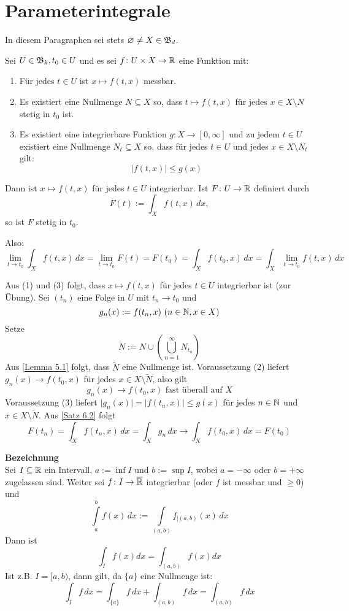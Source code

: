 \documentclass[a4paper,twoside,DIV15,BCOR12mm,chapterprefix=true,headings=onelinechapter]{scrbook}
\begin{document}
\chapter{Parameterintegrale}
In diesem Paragraphen sei stets \(\varnothing\neq X\in \mathfrak{B}_d\).

\begin{satz}
\label{Satz 7.1}
Sei \(U\in\mathfrak{B}_k, t_0\in U\) und es sei \(f\colon U\times X\to \mathbb{R}\) eine Funktion mit:
\begin{enumerate}
	\item 	Für jedes \(t\in U\) ist \(x\mapsto f(t,x)\) messbar.
	\item 	Es existiert eine Nullmenge \(N\subseteq X\) so, dass \(t\mapsto f(t,x)\) für jedes \(x\in X\setminus N\) stetig in $t_0$ ist.
	\item 	Es existiert eine integrierbare Funktion \(g\colon X\to [0,\infty]\) und zu jedem \(t\in U\) existiert eine Nullmenge \(N_t\subseteq X\) so, dass für 
		jedes \(t\in U\) und jedes \(x\in X\setminus N_t\) gilt: \[ \lvert f(t,x)\rvert \leq g(x) \]
\end{enumerate}
Dann ist \(x\mapsto f(t,x)\) für jedes \(t\in U\) integrierbar. Ist \(F\colon U\to\mathbb{R}\) definiert durch
\[ F(t):=\int_Xf(t,x)\,dx,\]
so ist $F$ stetig in $t_0$.
\end{satz}

Also: \[ \lim\limits_{t\to t_0}\int_X f(t,x)\,dx = \lim\limits_{t\to t_0}F(t)=F(t_0) = \int_X f(t_0,x)\,dx =\int_X\lim\limits_{t\to t_0} f(t,x)\,dx \]

\begin{beweis}
Aus (1) und (3) folgt, dass \(x\mapsto f(t,x)\) für jedes \(t\in U\) integrierbar ist (zur Übung). Sei \((t_n)\) eine Folge in $U$ mit \(t_n\to t_0\) und 
\[g_n(x):=f(t_n,x) \ (n\in\mathbb{N}, x\in X) \]
Setze \[ \tilde N := N\cup \left(\bigcup^\infty_{n=1}N_{t_n} \right) \]
Aus \ref{Lemma 5.1} folgt, dass \(\tilde N\) eine Nullmenge ist. Voraussetzung (2) liefert \(g_n(x)\to f(t_0,x)\) für jedes \(x\in X\setminus\tilde N\), also gilt 
\[g_n(x)\to f(t_0,x) \text{ fast überall auf } X\]
Voraussetzung (3) liefert \(\lvert g_n(x)\rvert = \lvert f(t_n,x)\rvert \leq g(x) \) für jedes \(n\in\mathbb{N}\) und \(x\in X\setminus\tilde N\). Aus \ref{Satz 6.2} folgt
\[ F(t_n) = \int_X f(t_n,x)\,dx = \int_Xg_n\,dx \longrightarrow \int_X f(t_0,x)\,dx = F(t_0) \]
\end{beweis}

\textbf{Bezeichnung}\\
Sei \(I\subseteq\mathbb{R}\) ein Intervall, \(a:=\inf I\) und \(b:=\sup I\), wobei \(a=-\infty\) oder \(b=+\infty\) zugelassen sind. Weiter sei \(f\colon I\to\overline{\mathbb{R}}\) integrierbar 
(oder $f$ ist messbar und \(\geq 0\)) und 
\[\int\limits^b_af(x)\,dx:=\int\limits_{(a,b)}f_{|(a,b)}(x)\,dx \]
Dann ist 
\[ \int_I f(x) dx = \int_{(a,b)} f(x) dx\]
Ist z.B. \(I=[a,b)\), dann gilt, da \(\{a\}\) eine Nullmenge ist: \[\int_If\,dx=\int_{\{a\}}f\,dx + \int_{(a,b)}f\,dx= \int_{(a,b)}f\,dx \] 
\end{document}
